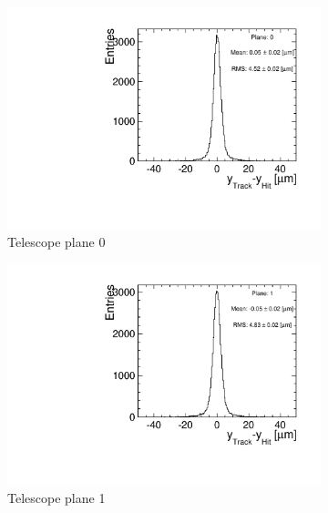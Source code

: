\begin{figure}[htbp] \centering
  \begin{subfigure}[b]{0.3\textwidth}
    \includegraphics[width=\textwidth]{figures/Telescope/biasedResiduals/BiasedResiduals_run661_PlaneYRMS0.pdf}
    \caption{Telescope  plane 0}
  \end{subfigure}\hfill
  \begin{subfigure}[b]{0.3\textwidth}
    \includegraphics[width=\textwidth]{figures/Telescope/biasedResiduals/BiasedResiduals_run661_PlaneYRMS1.pdf}
    \caption{Telescope  plane 1}
  \end{subfigure}\hfill
  \begin{subfigure}[b]{0.3\textwidth}

\end{subfigure}
\end{figure}
